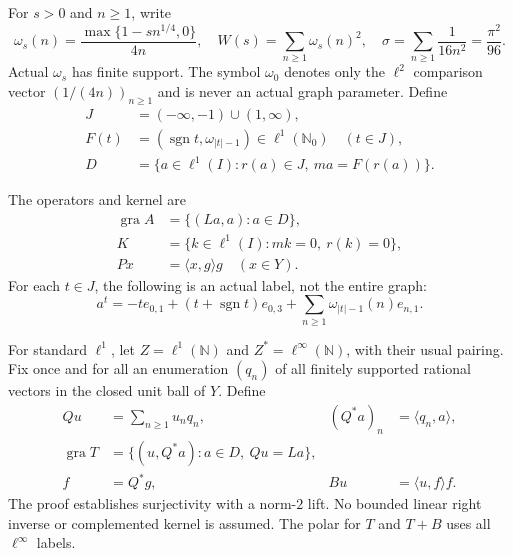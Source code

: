 \documentclass[11pt]{article}
\newcommand{\N}{\mathbb N}
\newcommand{\Nzero}{\mathbb N_0}
\newcommand{\gra}{\operatorname{gra}}
\newcommand{\sgn}{\operatorname{sgn}}
\newcommand{\pair}[2]{\langle #1,#2\rangle}
\begin{document}
For $s>0$ and $n\ge1$, write
\begin{equation}
\omega_s(n)=\frac{\max\{1-sn^{1/4},0\}}{4n},\quad
W(s)=\sum_{n\ge1}\omega_s(n)^2,\quad
\sigma=\sum_{n\ge1}\frac1{16n^2}=\frac{\pi^2}{96}.
\tag{D6}\label{eq:D6}
\end{equation}
Actual $\omega_s$ has finite support. The symbol $\omega_0$ denotes only
the $\ell^2$ comparison vector $(1/(4n))_{n\ge1}$ and is never an actual
graph parameter. Define
\begin{equation}
\begin{aligned}
J&=(-\infty,-1)\cup(1,\infty),\\
F(t)&=(\sgn t,\omega_{|t|-1})\in\ell^1(\Nzero)\quad(t\in J),\\
D&=\{a\in\ell^1(I):r(a)\in J,\ ma=F(r(a))\}.
\end{aligned}
\tag{D7}\label{eq:D7}
\end{equation}

The operators and kernel are
\begin{equation}
\begin{aligned}
\gra A&=\{(La,a):a\in D\},\\
K&=\{k\in\ell^1(I):mk=0,\ r(k)=0\},\\
Px&=\pair{x}{g}g\quad(x\in Y).
\end{aligned}
\tag{D8}\label{eq:D8}
\end{equation}
For each $t\in J$, the following is an actual label, not the entire graph:
\begin{equation}
a^t=-t e_{0,1}+(t+\sgn t)e_{0,3}
       +\sum_{n\ge1}\omega_{|t|-1}(n)e_{n,1}.
\tag{D9}\label{eq:D9}
\end{equation}

For standard $\ell^1$, let $Z=\ell^1(\N)$ and $Z^*=\ell^\infty(\N)$,
with their usual pairing. Fix once and for all an enumeration $(q_n)$ of
all finitely supported rational vectors in the closed unit ball of $Y$.
Define
\begin{equation}
\begin{aligned}
Qu&=\sum_{n\ge1}u_nq_n,& (Q^*a)_n&=\pair{q_n}{a},\\
\gra T&=\{(u,Q^*a):a\in D,\ Qu=La\},\\
f&=Q^*g,& Bu&=\pair{u}{f}f.
\end{aligned}
\tag{D10}\label{eq:D10}
\end{equation}
The proof establishes surjectivity with a norm-$2$ lift. No bounded linear
right inverse or complemented kernel is assumed. The polar for $T$ and
$T+B$ uses all $\ell^\infty$ labels.
\end{document}
